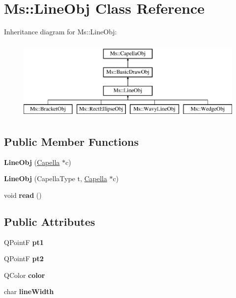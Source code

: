 \hypertarget{class_ms_1_1_line_obj}{}\section{Ms\+:\+:Line\+Obj Class Reference}
\label{class_ms_1_1_line_obj}
Inheritance diagram for Ms\+:\+:Line\+Obj\+:\begin{figure}[H]
\begin{center}
\leavevmode
\includegraphics[height=4.000000cm]{class_ms_1_1_line_obj}
\end{center}
\end{figure}
\subsection*{Public Member Functions}
\begin{DoxyCompactItemize}
\item 
\mbox{\label{class_ms_1_1_line_obj_aec5cce8780feadde6bdd2dbdf1c73bd0}} 
{\bfseries Line\+Obj} (\hyperlink{class_ms_1_1_capella}{Capella} $\ast$c)
\item 
\mbox{\label{class_ms_1_1_line_obj_a52d6a61a98a36bb7d97c4cc9d5f05251}} 
{\bfseries Line\+Obj} (Capella\+Type t, \hyperlink{class_ms_1_1_capella}{Capella} $\ast$c)
\item 
\mbox{\label{class_ms_1_1_line_obj_a138391c73d2e5aac1c4193c584e58e09}} 
void {\bfseries read} ()
\end{DoxyCompactItemize}
\subsection*{Public Attributes}
\begin{DoxyCompactItemize}
\item 
\mbox{\label{class_ms_1_1_line_obj_a80892c15e9497d96491c9cf49824472f}} 
Q\+PointF {\bfseries pt1}
\item 
\mbox{\label{class_ms_1_1_line_obj_a548f284ff31a9f770c1e737cc5f0b205}} 
Q\+PointF {\bfseries pt2}
\item 
\mbox{\label{class_ms_1_1_line_obj_a5f8327aa56cbd8878331ea6543e58f78}} 
Q\+Color {\bfseries color}
\item 
\mbox{\label{class_ms_1_1_line_obj_af0eec7584a1ef6396a42e04a0410483f}} 
char {\bfseries line\+Width}
\end{DoxyCompactItemize}

